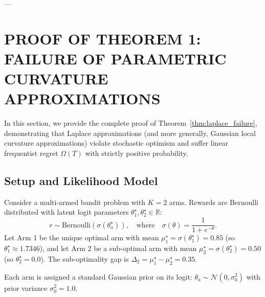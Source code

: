 \documentclass[twoside]{article}
\begin{document}
---

\section{PROOF OF THEOREM 1: FAILURE OF PARAMETRIC CURVATURE APPROXIMATIONS}
\label{app:proof_thm1}

In this section, we provide the complete proof of Theorem~\ref{thm:laplace_failure}, demonstrating that Laplace approximations (and more generally, Gaussian local curvature approximations) violate stochastic optimism and suffer linear frequentist regret $\Omega(T)$ with strictly positive probability.

\subsection{Setup and Likelihood Model}
Consider a multi-armed bandit problem with $K = 2$ arms. Rewards are Bernoulli distributed with latent logit parameters $\theta_1^\star, \theta_2^\star \in \mathbb{R}$:
\begin{equation}
r \sim \text{Bernoulli}(\sigma(\theta_a^\star)), \quad \text{where} \quad \sigma(\theta) = \frac{1}{1 + e^{-\theta}}.
\end{equation}
Let Arm 1 be the unique optimal arm with mean $\mu_1^\star = \sigma(\theta_1^\star) = 0.85$ (so $\theta_1^\star \approx 1.7346$), and let Arm 2 be a sub-optimal arm with mean $\mu_2^\star = \sigma(\theta_2^\star) = 0.50$ (so $\theta_2^\star = 0.0$). The sub-optimality gap is $\Delta_2 = \mu_1^\star - \mu_2^\star = 0.35$.

Each arm is assigned a standard Gaussian prior on its logit: $\theta_a \sim \mathcal{N}(0, \sigma_0^2)$ with prior variance $\sigma_0^2 = 1.0$.
\end{document}
